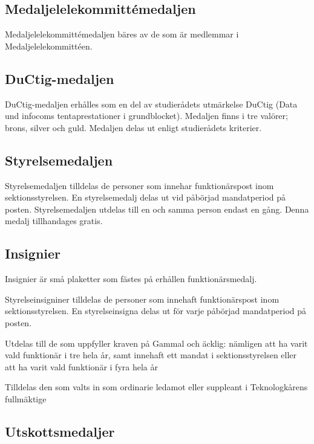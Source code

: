 \documentclass[pdfbookmarks,a4paper,11pt]{article}
\newlength{\itemcollength}
\newenvironment{reglemlista}{%
  \begin{list}{}{%
      \setlength{\labelwidth}{\itemcollength}%
      \setlength{\leftmargin}{\labelwidth + \labelsep}%
      \renewcommand{\makelabel}[1]{%
        \raisebox{0pt}[1ex][0pt]{%
          \makebox[\labelwidth][l]{%
            \parbox[t]{\itemcollength}{%
              \raggedright\hspace{0pt}##1}}}\hfill}%
      }}{%
  \end{list}}
\begin{document}
\subsection{Medaljelelekommittémedaljen}
Medaljelelekommittémedaljen bäres av de som är medlemmar i Medaljelelekommittéen.

\subsection{DuCtig-medaljen}
DuCtig-medaljen erhålles som en del av studierådets utmärkelse DuCtig (Data und infocoms tentaprestationer i grundblocket). Medaljen finns i tre valörer; brons, silver och guld. Medaljen delas ut enligt studierådets kriterier.

\subsection{Styrelsemedaljen}
Styrelsemedaljen tilldelas de personer som innehar funktionärspost inom sektionsstyrelsen. En
styrelsemedalj delas ut vid påbörjad mandatperiod på posten. Styrelsemedaljen utdelas till en
och samma person endast en gång. Denna medalj tillhandages gratis.

\subsection{Insignier}
Insignier är små plaketter som fästes på erhållen funktionärsmedalj.

\begin{reglemlista}
	\item[Styrelseinsigniner]
	Styrelseinsigniner tilldelas de personer som innehaft funktionärspost inom sektionsstyrelsen. En styrelseinsigna delas ut för varje påbörjad mandatperiod på posten.
	\item[Gammal och äcklig]
	Utdelas till de som uppfyller kraven på Gammal och äcklig: nämligen att ha varit vald funktionär i tre hela år, samt innehaft ett mandat i sektionsstyrelsen eller att ha varit vald funktionär i fyra hela år
	\item[TLTH-Fullmäktige]
	Tilldelas den som valts in som ordinarie ledamot eller suppleant i Teknologkårens fullmäktige

\end{reglemlista}
\subsection{Utskottsmedaljer}
    
\end{document}
